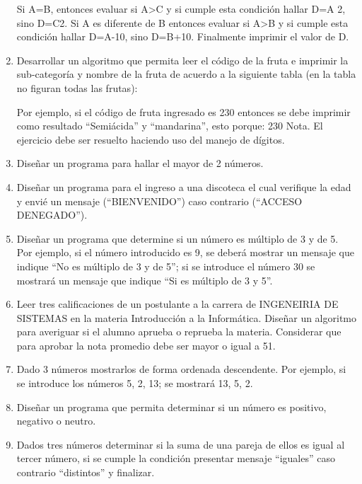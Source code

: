 \documentclass{scrartcl}
\begin{document}
\begin{enumerate}
		Si A=B, entonces evaluar si A>C y si cumple esta condición hallar D=A 2, sino D=C2. Si A es diferente de B entonces evaluar si A>B y si cumple esta condición hallar D=A-10, sino D=B+10. Finalmente imprimir el valor de D.
		
		\item Desarrollar un algoritmo que permita leer el código de la fruta e imprimir la sub-categoría y nombre de la fruta de acuerdo a la siguiente tabla (en la tabla no figuran todas las frutas):
		
		Por ejemplo, si el código de fruta ingresado es 230 entonces se debe imprimir como
		resultado “Semiácida” y “mandarina”, esto porque:
		230
		Nota. El ejercicio debe ser resuelto haciendo uso del manejo de dígitos.
		
		\item Diseñar un programa para hallar el mayor de 2 números.

		\item Diseñar un programa para el ingreso a una discoteca el cual verifique la edad y envié un mensaje (“BIENVENIDO”) caso contrario (“ACCESO DENEGADO”).
		
		\item Diseñar un programa que determine si un número es múltiplo de 3 y de 5. Por ejemplo, si el número introducido es 9, se deberá mostrar un mensaje que indique “No es múltiplo	de 3 y de 5”; si se introduce el número 30 se mostrará un mensaje que indique “Si es múltiplo de 3 y 5”.
		
		\item Leer tres calificaciones de un postulante a la carrera de INGENEIRIA DE SISTEMAS en	la materia Introducción a la Informática. Diseñar un algoritmo para averiguar si el alumno aprueba o reprueba la materia. Considerar que para aprobar la nota promedio debe ser mayor o igual a 51.
		
		\item Dado 3 números mostrarlos de forma ordenada descendente. Por ejemplo, si se
		introduce los números 5, 2, 13; se mostrará 13, 5, 2.
		
		\item Diseñar un programa que permita determinar si un número es positivo, negativo o neutro.
		
		\item Dados tres números determinar si la suma de una pareja de ellos es igual al tercer número, si se cumple la condición presentar mensaje “iguales” caso contrario “distintos” y finalizar.
		

\end{enumerate}
\end{document}
